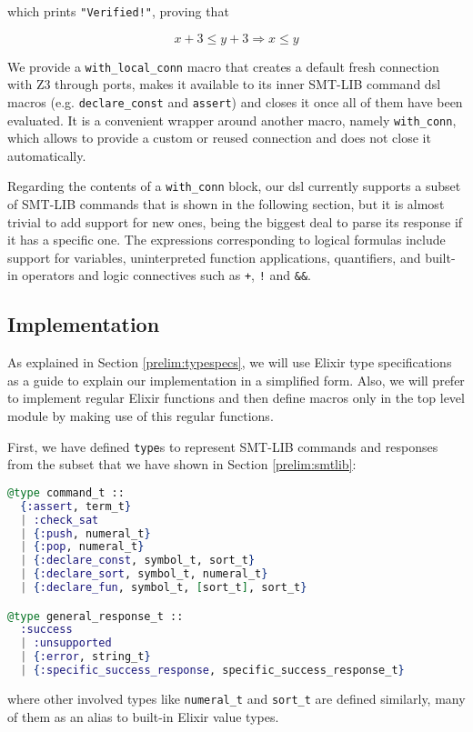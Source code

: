 which prints \verb|"Verified!"|, proving that 

$$x + 3\leq y + 3 \Rightarrow x \leq y$$

We provide a \verb|with_local_conn| macro that creates a default fresh
connection with Z3 through ports, makes it available to its inner SMT-LIB
command \gls{dsl} macros (e.g. \verb|declare_const| and \verb|assert|) and
closes it once all of them have been evaluated. It is a convenient wrapper
around another macro, namely \verb|with_conn|, which allows to provide a custom
or reused connection and does not close it automatically.

Regarding the contents of a \verb|with_conn| block, our \gls{dsl} currently
supports a subset of SMT-LIB commands that is shown in the following section,
but it is almost trivial to add support for new ones, being the biggest deal to
parse its response if it has a specific one.  The expressions corresponding to
logical formulas include support for variables, uninterpreted function
applications, quantifiers, and built-in operators and logic connectives such as
\verb|+|, \verb|!| and \verb|&&|.

\subsection{Implementation}

As explained in Section \ref{prelim:typespecs}, we will use Elixir type
specifications as a guide to explain our implementation in a simplified form.
Also, we will prefer to implement regular Elixir functions and then define 
macros only in the top level module by making use of this regular functions.

First, we have defined \verb|type|s to represent SMT-LIB commands and responses
from the subset that we have shown in Section \ref{prelim:smtlib}:

\begin{lstlisting}[language=elixir,numbers=none,frame=none]
@type command_t ::
  {:assert, term_t}
  | :check_sat
  | {:push, numeral_t}
  | {:pop, numeral_t}
  | {:declare_const, symbol_t, sort_t}
  | {:declare_sort, symbol_t, numeral_t}
  | {:declare_fun, symbol_t, [sort_t], sort_t}

@type general_response_t ::
  :success
  | :unsupported
  | {:error, string_t}
  | {:specific_success_response, specific_success_response_t}
\end{lstlisting}

where other involved types like \verb|numeral_t| and \verb|sort_t| are defined 
similarly, many of them as an alias to built-in Elixir value types.

